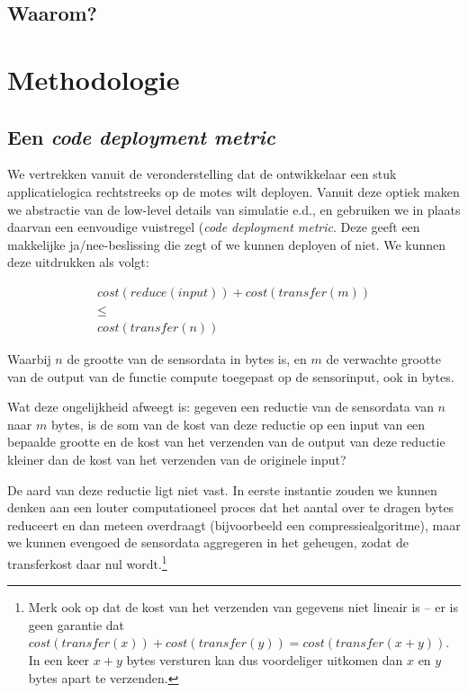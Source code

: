 \documentclass{article}
\begin{document}
\subsection{Waarom?}
\section{Methodologie}
\subsection{Een \textit{code deployment metric}}
We vertrekken vanuit de veronderstelling dat de ontwikkelaar een stuk
applicatielogica rechtstreeks op de motes wilt deployen. Vanuit deze optiek
maken we abstractie van de low-level details van simulatie e.d., en gebruiken we
in plaats daarvan een eenvoudige vuistregel (\textit{code deployment
metric}. Deze geeft een makkelijke ja/nee-beslissing die zegt of we kunnen
deployen of niet. We kunnen deze uitdrukken als volgt:

\begin{equation}
  \begin{split}
    cost(reduce(input)) + cost(transfer(m)) \\ 
    \leq \\ 
    cost(transfer(n))
  \end{split}
\end{equation}

Waarbij $n$ de grootte van de sensordata in bytes is, en $m$ de verwachte
grootte van de output van de functie compute toegepast op de sensorinput, ook in
bytes.

Wat deze ongelijkheid afweegt is: gegeven een reductie van de sensordata van $n$ naar
$m$ bytes, is de som van de kost van deze reductie op een input van een bepaalde
grootte en de kost van het verzenden van de output van deze reductie kleiner dan
de kost van het verzenden van de originele input?

De aard van deze reductie ligt niet vast. In eerste instantie zouden we kunnen
denken aan een louter computationeel proces dat het aantal over te dragen bytes
reduceert en dan meteen overdraagt (bijvoorbeeld een compressiealgoritme), maar
we kunnen evengoed de sensordata aggregeren in het geheugen, zodat de
transferkost daar nul wordt.\footnote{Merk ook op dat de kost van het verzenden
van gegevens niet lineair is -- er is geen garantie dat $cost(transfer(x)) +
cost(transfer(y)) = cost(transfer(x + y))$. In een keer $x + y$ bytes versturen
kan dus voordeliger uitkomen dan $x$ en $y$ bytes apart te verzenden.}
\end{document}
